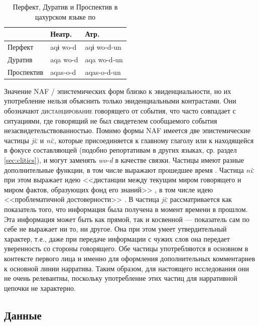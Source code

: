 \begin{table}[H]
\caption{Перфект, Дуратив и Проспектив в цахурском языке по \cite{maisaktatevosov2007}}
\label{tab:tsakhparad2}
\vspace{0.2cm}
\begin{center}
\begin{tabular}{l|ll}
           & Неатр.   & Атр.        \\ \hline
Перфект    & aqɨ wo-d & aqɨ wo-d-un \\
Дуратив    & aqa wo-d & aqa wo-d-un \\
Проспектив & aqas-o-d & aqas-o-d-un
\end{tabular}
\end{center}
\end{table}

Значение NAF / эпистемических форм близко к эвиденциальности, но их употребление нельзя объяснить только эвиденциальными контрастами. Они обозначают \textsc{дистанцирование} говорящего от события, что часто совпадает с ситуациями, где говорящий не был свидетелем сообщаемого события незасвидетельствованностью. Помимо формы NAF имеется две эпистемические частицы \textit{jiː} и \textit{niː}, которые присоединяется к главному глаголу или к находящейся в фокусе составляющей (подобно репортативам в других языках, ср. раздел \ref{sec:clitics}), и могут заменять \textit{wo-d} в качестве связки. Частицы имеют разные дополнительные функции, в том числе выражают прошедшее время \citep{tatevosovmaisak1998}. Частица \textit{niː} при этом выражает идею <<дистанции между текущим миром говорящего и миром фактов, образующих фонд его знаний>> \citep[726]{tsakhurgram}, в том числе идею <<проблематичной достоверности>> \citep{tatevosovmaisak1998}. В \citep[392--403]{maisaktatevosov2007} частица \textit{jiː} рассматривается как показатель того, что информация была получена в момент времени в прошлом. Эта информация может быть как прямой, так и косвенной — показатель сам по себе не выражает ни то, ни другое. Она при этом умеет утвердительный характер, т.е., даже при передаче информации с чужих слов она передает уверенность со стороны говорящего. Обе частицы употребляются в основном в контексте первого лица и именно для оформления дополнительных комментариев к основной линии нарратива. Таким образом, для настоящего исследования они не очень релевантны, поскольку употребление этих частиц для нарративной цепочки не характерно.

\subsection{Данные} \label{sec:sampledata}

